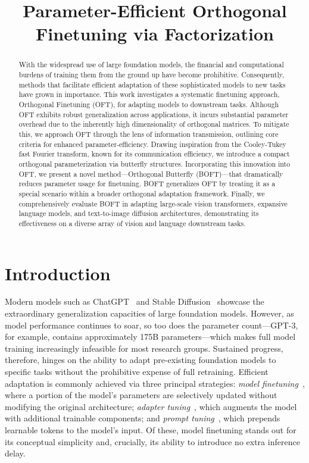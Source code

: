 \title{Parameter-Efficient Orthogonal Finetuning via Factorization}

\begin{abstract}
With the widespread use of large foundation models, the financial and computational burdens of training them from the ground up have become prohibitive. Consequently, methods that facilitate efficient adaptation of these sophisticated models to new tasks have grown in importance. This work investigates a systematic finetuning approach, Orthogonal Finetuning (OFT), for adapting models to downstream tasks. Although OFT exhibits robust generalization across applications, it incurs substantial parameter overhead due to the inherently high dimensionality of orthogonal matrices. To mitigate this, we approach OFT through the lens of information transmission, outlining core criteria for enhanced parameter-efficiency. Drawing inspiration from the Cooley-Tukey fast Fourier transform, known for its communication efficiency, we introduce a compact orthogonal parameterization via butterfly structures. Incorporating this innovation into OFT, we present a novel method—Orthogonal Butterfly (BOFT)—that dramatically reduces parameter usage for finetuning. BOFT generalizes OFT by treating it as a special scenario within a broader orthogonal adaptation framework. Finally, we comprehensively evaluate BOFT in adapting large-scale vision transformers, expansive language models, and text-to-image diffusion architectures, demonstrating its effectiveness on a diverse array of vision and language downstream tasks.
\end{abstract}

\section{Introduction}

Modern models such as ChatGPT~\cite{brown2020language,chen2021evaluating} and Stable Diffusion~\cite{rombach2022high} showcase the extraordinary generalization capacities of large foundation models. However, as model performance continues to soar, so too does the parameter count—GPT-3, for example, contains approximately 175B parameters—which makes full model training increasingly infeasible for most research groups. Sustained progress, therefore, hinges on the ability to adapt pre-existing foundation models to specific tasks without the prohibitive expense of full retraining. Efficient adaptation is commonly achieved via three principal strategies: \emph{model finetuning}~\cite{hulora2022,zaken2022bitfit,guo2020parameter,raffel2020exploring,qiu2023controlling,zhang2022adaptive,chavan2023one}, where a portion of the model's parameters are selectively updated without modifying the original architecture; \emph{adapter tuning}~\cite{rebuffi2017learning,houlsby2019parameter,pfeiffer2020adapterfusion,lin2020exploring,he2021towards}, which augments the model with additional trainable components; and \emph{prompt tuning}~\cite{li2021prefix,lester2021power}, which prepends learnable tokens to the model's input. Of these, model finetuning stands out for its conceptual simplicity and, crucially, its ability to introduce no extra inference delay.

